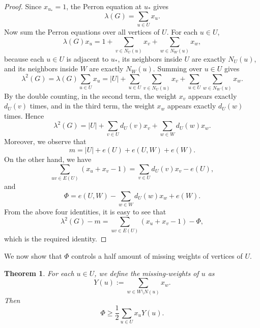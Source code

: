 \documentclass[11pt,a4paper]{article}
\newtheorem{theorem}{Theorem}[section]
\theoremstyle{definition}
\theoremstyle{plain}
\renewcommand{\ge}{\geqslant}
\begin{document}
\begin{proof}
Since $x_{u_*}=1$, the Perron equation at $u_*$ gives
\[
\lambda(G)=\sum_{u\in U}x_u.
\]
Now sum the Perron equations over all vertices of $U$. For each $u\in U$,
\[
\lambda(G)x_u=1+\sum_{v\in N_U(u)}x_v+\sum_{w\in N_W(u)}x_w,
\]
because each $u\in U$ is adjacent to $u_*$, its neighbors inside $U$ are exactly $N_U(u)$, and its neighbors inside $W$ are exactly $N_W(u)$.
Summing over $u\in U$ gives
\[ \lambda^2 (G) = 
\lambda(G)\sum_{u\in U}x_u
=
|U|+\sum_{u\in U}\sum_{v\in N_U(u)}x_v+\sum_{u\in U}\sum_{w\in N_W(u)}x_w.
\]
By the double counting, in the second term, the weight $x_v$ appears exactly $d_U(v)$ times, and in the third term, the weight $x_w$ appears exactly $d_U(w)$ times. 
Hence
\[
\lambda^2 (G)=|U|+\sum_{v\in U}d_U(v)x_v+\sum_{w\in W}d_U(w)x_w.
\] 
Moreover, we observe that 
\[
m=|U|+e(U)+e(U,W)+e(W).
\] 
On the other hand, we have
\[
\sum_{uv\in E(U)}(x_u+x_v-1)=\sum_{v\in U}d_U(v) x_v -e(U),
\]
and 
\[ \Phi =e(U,W) - \sum_{w\in W} d_U(w)x_w + e(W). \]
From the above four identities, it is easy to see that 
\[
\lambda^2(G)-m=\sum_{uv\in E(U)}(x_u+x_v-1)- \Phi,
\]
which is the required identity.
\end{proof}

We now show that $\Phi$ controls a half amount of missing weights of vertices of $U$.


\begin{theorem} \label{thm:halfmissing}
For each $u\in U$, we define the missing-weights of $u$ as  
$$ Y(u):=\sum_{w\in W\setminus N(u)}x_w. $$
Then  
\[
\Phi\ge \frac12\sum_{u\in U}x_uY(u).
\]
\end{theorem}
\end{document}
